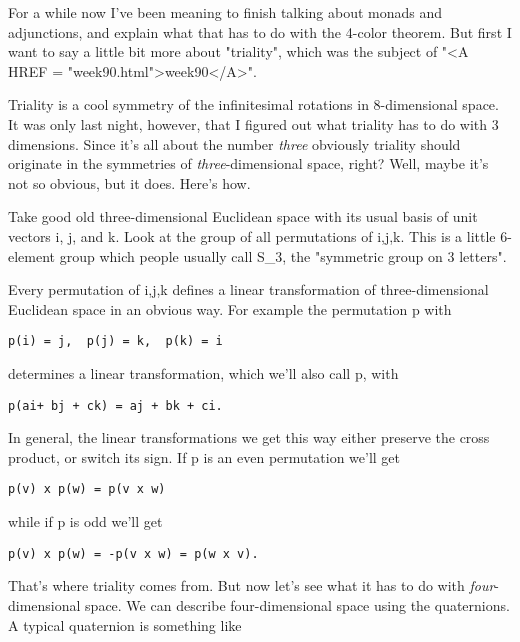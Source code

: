 


For a while now I've been meaning to finish talking about monads
and adjunctions, and explain what that has to do with the 4-color 
theorem.  But first I want to say a little bit more about "triality", 
which was the subject of "<A HREF = "week90.html">week90</A>".

Triality is a cool symmetry of the infinitesimal rotations in
8-dimensional space.  It was only last night, however, that I figured
out what triality has to do with 3 dimensions.  Since it's all about
the number \emph{three} obviously triality should originate in the
symmetries of \emph{three}-dimensional space, right?  Well, maybe
it's not so obvious, but it does.  Here's how.

Take good old three-dimensional Euclidean space with its usual
basis of unit vectors i, j, and k.  Look at the group of all
permutations of {i,j,k}.  This is a little 6-element group
which people usually call S_{3}, 
the "symmetric group on 3 letters".

Every permutation of {i,j,k} defines a linear transformation
of three-dimensional Euclidean space in an obvious way.  For 
example the permutation p with

\begin{verbatim}
p(i) = j,  p(j) = k,  p(k) = i
\end{verbatim}
    
determines a linear transformation, which we'll also call p, with

\begin{verbatim}
p(ai+ bj + ck) = aj + bk + ci.
\end{verbatim}
    
In general, the linear transformations we get this way
either preserve the cross product, or switch its sign.
If p is an even permutation we'll get

\begin{verbatim}
p(v) x p(w) = p(v x w)
\end{verbatim}
    
while if p is odd we'll get 

\begin{verbatim}
p(v) x p(w) = -p(v x w) = p(w x v).
\end{verbatim}
    
That's where triality comes from.  But now let's see what it
has to do with \emph{four}-dimensional space.  
We can describe four-dimensional
space using the quaternions.  A typical quaternion is something like

